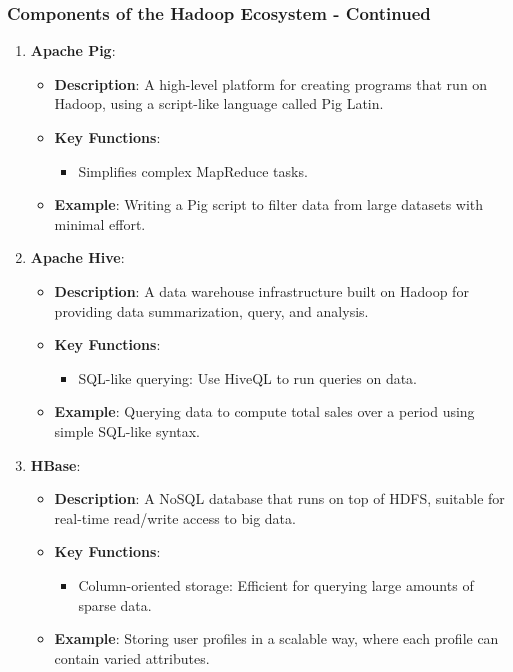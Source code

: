 \documentclass[aspectratio=169]{beamer}
\begin{document}
\begin{frame}[fragile]
    \frametitle{Components of the Hadoop Ecosystem - Continued}
    \begin{enumerate}[resume]
        \item \textbf{Apache Pig}:
            \begin{itemize}
                \item \textbf{Description}: A high-level platform for creating programs that run on Hadoop, using a script-like language called Pig Latin.
                \item \textbf{Key Functions}:
                    \begin{itemize}
                        \item Simplifies complex MapReduce tasks.
                    \end{itemize}
                \item \textbf{Example}: Writing a Pig script to filter data from large datasets with minimal effort.
            \end{itemize}
        
        \item \textbf{Apache Hive}:
            \begin{itemize}
                \item \textbf{Description}: A data warehouse infrastructure built on Hadoop for providing data summarization, query, and analysis.
                \item \textbf{Key Functions}:
                    \begin{itemize}
                        \item SQL-like querying: Use HiveQL to run queries on data.
                    \end{itemize}
                \item \textbf{Example}: Querying data to compute total sales over a period using simple SQL-like syntax.
            \end{itemize}
        
        \item \textbf{HBase}:
            \begin{itemize}
                \item \textbf{Description}: A NoSQL database that runs on top of HDFS, suitable for real-time read/write access to big data.
                \item \textbf{Key Functions}:
                    \begin{itemize}
                        \item Column-oriented storage: Efficient for querying large amounts of sparse data.
                    \end{itemize}
                \item \textbf{Example}: Storing user profiles in a scalable way, where each profile can contain varied attributes.
            \end{itemize}
    \end{enumerate}
\end{frame}
\end{document}
